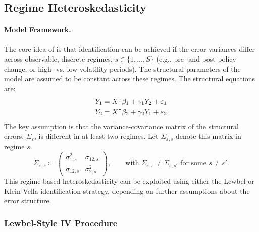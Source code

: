 \subsection{Regime Heteroskedasticity \textcite{rigobon2003}}
\label{sec:rigobon_application}
\paragraph{Model Framework.}
The core idea of \textcite{rigobon2003} is that identification can be achieved if the error variances differ across observable, discrete regimes, $s \in \{1, \dots, S\}$ (e.g., pre- and post-policy change, or high- vs. low-volatility periods). The structural parameters of the model are assumed to be constant across these regimes. The structural equations are:
\begin{align*}
Y_{1} & =X^{\intercal}\beta_{1}+\gamma_{1}Y_{2}+\varepsilon_{1}\\
Y_{2} & =X^{\intercal}\beta_{2}+\gamma_{2}Y_{1}+\varepsilon_{2}
\end{align*}
The key assumption is that the variance-covariance matrix of the structural errors, $\Sigma_{\varepsilon}$, is different in at least two regimes. Let $\Sigma_{\varepsilon, s}$ denote this matrix in regime $s$.
\[
\Sigma_{\varepsilon, s} \coloneqq \begin{pmatrix} \sigma_{1,s}^2 & \sigma_{12,s} \\ \sigma_{12,s} & \sigma_{2,s}^2 \end{pmatrix}, \qquad \text{with } \Sigma_{\varepsilon, s} \neq \Sigma_{\varepsilon, s'} \text{ for some } s \neq s'.
\]
This regime-based heteroskedasticity can be exploited using either the Lewbel or Klein-Vella identification strategy, depending on further assumptions about the error structure.

\subsubsection{Lewbel-Style IV Procedure}
